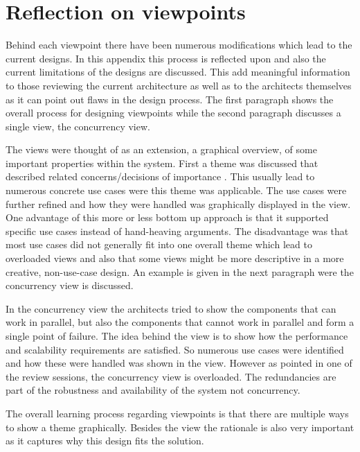 \section{Reflection on viewpoints}

Behind each viewpoint there have been numerous modifications which lead to the current designs. In this appendix this process is reflected upon and also the current limitations of the designs are discussed.  This add meaningful information to those reviewing the current architecture as well as to the architects themselves as it can point out flaws in the design process. The first paragraph shows the overall process for designing viewpoints while the second paragraph discusses a single view, the concurrency view. \newline

The views were thought of as an extension, a graphical overview, of some important properties within the system. First a theme was discussed that described related concerns/decisions of importance . This usually lead to numerous concrete use cases were this theme was applicable. The use cases were further refined and how they were handled was graphically displayed in the view. One advantage of this more or less bottom up approach is that it supported specific use cases instead of hand-heaving arguments. The disadvantage was that most use cases did not generally fit into one overall theme which lead to overloaded views and also that some views might be more descriptive in a more creative, non-use-case design. An example is given in the next paragraph were the concurrency view is discussed.\newline

In the concurrency view the architects tried to show the components that can work in parallel, but also the components that cannot work in parallel and form a single point of failure. The idea behind the view is to show how the performance and scalability requirements  are satisfied. So numerous use cases were identified and how these were handled was shown in the view. However as pointed in one of the review sessions, the concurrency view is overloaded. The redundancies are part of the robustness and availability of the system not concurrency. \newline 

The overall learning process regarding viewpoints is that there are multiple ways to show a theme graphically. Besides the view the rationale is also very important as it captures why this design fits the solution.